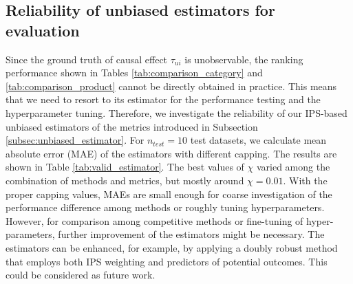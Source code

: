 \documentclass[manuscript,screen]{acmart}
\begin{document}
\subsection{Reliability of unbiased estimators for evaluation}
\label{subsec:reliability_unbiased_estimators}
Since the ground truth of causal effect $\tau_{ui}$ is unobservable, the ranking performance shown in Tables \ref{tab:comparison_category} and \ref{tab:comparison_product} cannot be directly obtained in practice.
This means that we need to resort to its estimator for the performance testing and the hyperparameter tuning.
Therefore, we investigate the reliability of our IPS-based unbiased estimators of the metrics introduced in Subsection \ref{subsec:unbiased_estimator}.
For $n_{test}=10$ test datasets, we calculate mean absolute error (MAE) of the estimators with different capping.
The results are shown in Table \ref{tab:valid_estimator}.
The best values of $\chi$ varied among the combination of methods and metrics, but mostly around $\chi=0.01$.
With the proper capping values, MAEs are small enough for coarse investigation of the performance difference among methods or roughly tuning hyperparameters.
However, for comparison among competitive methods or fine-tuning of hyper-parameters, further improvement of the estimators might be necessary.
The estimators can be enhanced, for example, by applying a doubly robust method \cite{Wang19} that employs both IPS weighting and predictors of potential outcomes.
This could be considered as future work.
\end{document}
